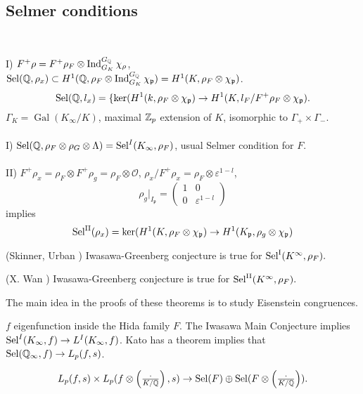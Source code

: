 \documentclass[12pt,amsfont]{amsart}
\begin{document}
\subsection{Selmer conditions}
{\ }

I) $F^+ \rho = F^+ \rho_F \otimes \operatorname{Ind}_{G_K}^{G_{\mathbb Q}} \chi_\rho$, $\operatorname{Sel}({\mathbb Q}, \rho_x) \subset H^1 ({\mathbb Q}, \rho_F \otimes \operatorname{Ind}_{G_K}^{G_{\mathbb Q}} \chi_{\mathfrak{p}}) = H^1(K, \rho_F \otimes \chi_{\mathfrak{p}})$. 
$$\operatorname{Sel}({\mathbb Q}, l_x) = \{\ker(H^1(k, \rho_F \otimes \chi_\mathfrak{p}) \rightarrow H^1 (K, l_F / F^+ \rho_F \otimes \chi_\mathfrak{p}).$$
$\Gamma_K = \operatorname{Gal}(K_\infty/K)$, maximal ${\mathbb Z}_p$ extension of $K$, isomorphic to $\Gamma_+ \times \Gamma_{-}$. \\ \\
I) $\operatorname{Sel}({\mathbb Q}, \rho_F \otimes \rho_G \otimes \Lambda) = \operatorname{Sel}^I(K_\infty, \rho_F)$, usual Selmer condition for $F$. \\ \\
II) $F^+\rho_x = \rho_F \otimes F^+ \rho_g = \rho_F \otimes \mathcal{O}$, $\rho_x/ F^+ \rho_x = \rho_F \otimes \varepsilon^{1 - l}$, 
$$\displaystyle \rho_g |_{I_\mathfrak{p}} = \begin{pmatrix} 1 & 0 \\ 0 & \varepsilon^{1 - l} \end{pmatrix}$$
implies
$$\displaystyle \operatorname{Sel}^{\text{II}}(\rho_x) = \ker(H^1(K, \rho_F \otimes \chi_{\mathfrak{p}} ) \rightarrow H^1 (K_\mathfrak{p}, \rho_g \otimes \chi_\mathfrak{p})$$

\begin{thm} (Skinner, Urban ) Iwasawa-Greenberg conjecture is true for $\operatorname{Sel}^{\textrm I}(K^\infty, \rho_F).$
\end{thm}

\begin{thm} (X. Wan ) Iwasawa-Greenberg conjecture is true for $\operatorname{Sel}^{\textrm{II}}(K^\infty, \rho_F).$
\end{thm}

The main idea in the proofs of these theorems is to study Eisenstein congruences. 

\begin{rmk} $f$ eigenfunction inside the Hida family ${F}$. The Iwasawa Main Conjecture implies $\operatorname{Sel}^I(K_\infty, f) \rightarrow L^I(K_\infty, f)$. Kato has a theorem implies that $\operatorname{Sel}({\mathbb Q}_\infty, f) \rightarrow L_p(f, s)$. 

\[
L_p(f,s) \times L_p(f \otimes \left(\tfrac{\cdot}{K/{\mathbb Q}}\right), s) \rightarrow \operatorname{Sel}(F) \oplus \operatorname{Sel}(F \otimes\left(\tfrac{\cdot}{K/{\mathbb Q}}\right)).
\]
\end{rmk}
\end{document}
